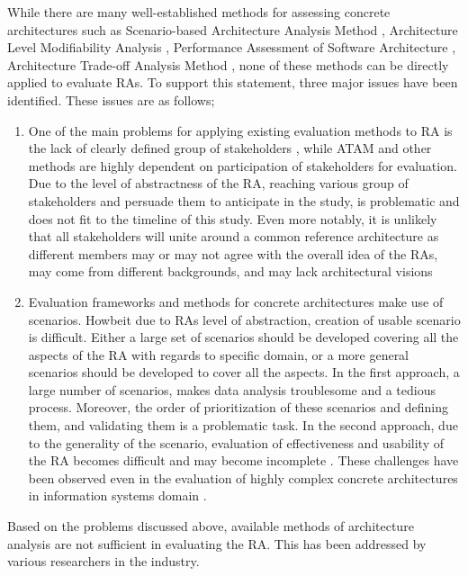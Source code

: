 \documentclass[review]{elsarticle}
\begin{document}
While there are many well-established methods for assessing concrete architectures such as Scenario-based Architecture Analysis Method \cite{kazman1994saam}, Architecture Level Modifiability Analysis \cite{Bengtsson}, Performance Assessment of Software Architecture \cite{Williams}, Architecture Trade-off Analysis Method \cite{KazmanATAM}, none of these methods can be directly applied to evaluate RAs. To support this statement, three major issues have been identified. These issues are as follows;

\begin{enumerate}
    \item One of the main problems for applying existing evaluation methods to RA is the lack of clearly defined group of stakeholders \cite{angelov2008towards}, while ATAM and other methods are highly dependent on participation of stakeholders for evaluation. Due to the level of abstractness of the RA, reaching various group of stakeholders and persuade them to anticipate in the study, is problematic and does not fit to the timeline of this study. Even more notably, it is unlikely that all stakeholders will unite around a common reference architecture as different members may or may not agree with the overall idea of the RAs, may come from different backgrounds, and may lack architectural visions 
    \item Evaluation frameworks and methods for concrete architectures make use of scenarios. Howbeit due to RAs level of abstraction, creation of usable scenario is difficult. Either a large set of scenarios should be developed covering all the aspects of the RA with regards to specific domain, or a more general scenarios should be developed to cover all the aspects. In the first approach, a large number of scenarios, makes data analysis troublesome and a tedious process. Moreover, the order of prioritization of these scenarios and defining them, and validating them is a problematic task. In the second approach, due to the generality of the scenario, evaluation of effectiveness and usability of the RA becomes difficult and may become incomplete \cite{Avgeriou}. These challenges have been observed even in the evaluation of highly complex concrete architectures in information systems domain \cite{bengtsson1998scenario}. 
\end{enumerate}

Based on the problems discussed above, available methods of architecture analysis are not sufficient in evaluating the RA. This has been addressed by various researchers in the industry. 
\end{document}
